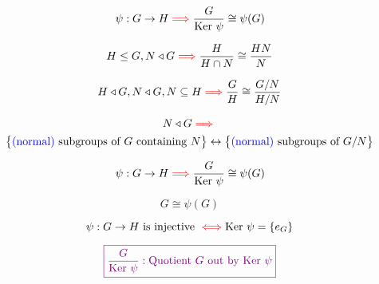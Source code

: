 
\begin{frame}
  \centerline{}
\end{frame}

\begin{frame}
  \begin{theorem}
	\[
	  \psi: G \to H \textcolor{red}{\implies} \frac{G}{\text{Ker } \psi} \cong \psi(G)
	\]
  \end{theorem}
  
  \begin{theorem}
	\[
	  H \le G, N \triangleleft G \textcolor{red}{\implies} \frac{H}{H \cap N} \cong \frac{HN}{N} 
	\]
  \end{theorem}

  \begin{theorem}
	\[
	  H \triangleleft G, N \triangleleft G, N \subseteq H \textcolor{red}{\implies} \frac{G}{H} \cong \frac{G/N}{H/N}
	\]
  \end{theorem}

  \begin{theorem}
	\vspace{-0.50cm}
	\begin{gather*}
	  N \triangleleft G \textcolor{red}{\implies} \\
	  \big\{\text{\textcolor{blue}{(normal)} subgroups of $G$ containing $N$}\big\} 
	  \leftrightarrow \big\{\text{\textcolor{blue}{(normal)} subgroups of $G/N$}\big\}
	\end{gather*}
  \end{theorem}
\end{frame}

\begin{frame}
  \begin{theorem}
	\[
	  \psi: G \to H \textcolor{red}{\implies} \frac{G}{\text{Ker } \psi} \cong \psi(G)
	\]
  \end{theorem}

  \pause
  \begin{center}
	 \pause
	\[
	  G \cong \psi(G)
	\]
	\pause
  \end{center}

  \pause
  \begin{theorem}
	\[
	  \psi: G \to H \text{ is injective } \textcolor{red}{\iff} \text{Ker } \psi = \left\{e_G\right\}
	\]
  \end{theorem}

  \pause
  \vspace{-0.80cm}
  \begin{center}
	\[
	  \textcolor{violet}{\boxed{\frac{G}{\text{Ker } \psi}: \text{Quotient } G \text{ out by } \text{Ker } \psi}}
	\]
  \end{center}
\end{frame}

